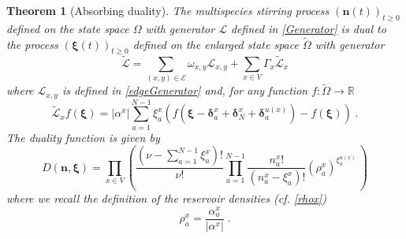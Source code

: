 \documentclass[10pt]{article}
\numberwithin{equation}{section}
\numberwithin{equation}{subsection}
\newtheorem{theorem}{Theorem}
\newcommand{\dt}{\;.}
\begin{document}
\begin{theorem}[Absorbing duality]\label{thm-duality}
	The multispecies stirring process $(\bm{n}(t))_{t\geq 0}$ defined on the state space $\Omega$ with generator $\mathcal{L}$ defined in \eqref{Generator} is dual to the process $(\bm{\xi}(t))_{t\geq 0}$ defined on the enlarged state space $\widetilde{\Omega}$ with generator
	 \begin{equation}\label{DualGenerator}
		\widetilde{\mathcal{L}}=\sum_{(x,y)\in \mathcal{E}}\omega_{x,y}\mathcal{L}_{x,y}+\sum_{x\in V}\Gamma_{x}\widetilde{\mathcal{L}}_{x}
	\end{equation}
where 
$\mathcal{L}_{x,y}$ is defined in \eqref{edgeGenerator} and, for any function $f:\widetilde{\Omega}\to \mathbb{R}$ 
\begin{equation}\label{siteDualGenerator}
	\widetilde{\mathcal{L}}_{x}f(\bm{\xi})=|\alpha^{x}|\sum_{a=1}^{N-1}\xi_{a}^{x}\left(f(\bm{\xi}-\bm{\delta}_{a}^{x}+\bm{\delta}_{N}^{x}+\bm{\delta}_{a}^{u(x)})-f(\bm{\xi})\right)\dt
\end{equation}
The duality function is given by 
\begin{equation}\label{dualityElements}
	D(\bm{n},\bm{\xi})=\prod_{x\in V}\left(\frac{(\nu -\sum_{a=1}^{N-1}\xi_{a}^{x})!}{\nu!}\prod_{a=1}^{N-1}\frac{n_{a}^{x}!}{(n_{a}^{x}-\xi_{a}^{x})!}\left(\rho_{a}^{x}\right)^{\xi_{a}^{u(x)}}\,\right)
\end{equation}
where we recall the definition of the reservoir densities (cf. \eqref{rhox})
\begin{equation}
	\rho_{a}^{x}=\frac{\alpha_{a}^{x}}{|\alpha^{x}|}\dt
\end{equation}
\end{theorem}
\end{document}
